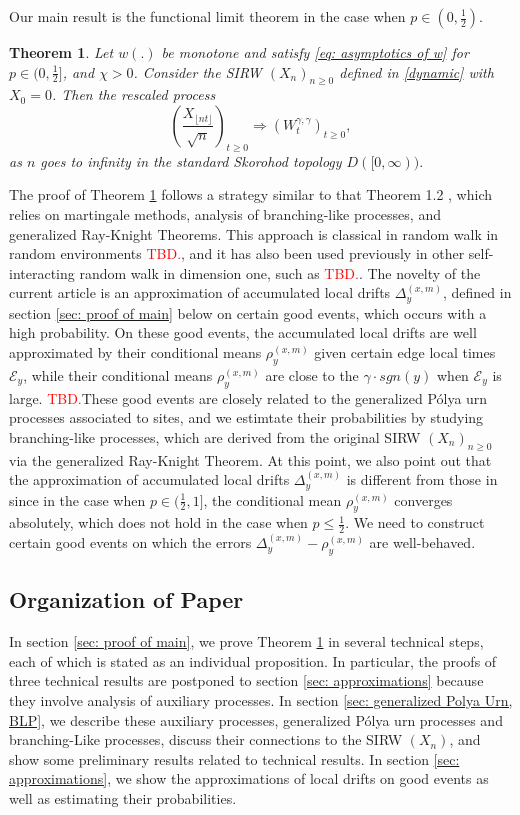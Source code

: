 \documentclass[twoside,12pt,a4paper]{article}
\newtheorem{theorem}{Theorem}[section]
\numberwithin{equation}{section}
\newcommand\TBD{\textcolor{red}{TBD.}}
\begin{document}
Our main result is the functional limit theorem in the case when $p\in (0,\frac{1}{2})$.
\begin{theorem}\label{thm: main}
 Let $w(.)$ be monotone and satisfy \eqref{eq: asymptotics of w} for $p\in (0,\frac{1}{2}]$, and $\mathcal{\chi} >0 $. Consider the SIRW $(X_n)_{n\geq 0}$ defined in \eqref{dynamic} with $X_0 =0$. Then the rescaled process
	 $$
	 \left(  \frac{X_{\lfloor nt \rfloor }}{\sqrt{n}}  \right)_{t\geq 0} \Longrightarrow \left( W^{\gamma,\gamma}_{t}\right)_{t\geq 0},
	 $$ as $n$ goes to infinity in the standard Skorohod topology $D([0,\infty) ).$
\end{theorem}
The proof of Theorem \ref{thm: main} follows a strategy similar to that Theorem 1.2 \cite{KMP22}, which relies on martingale methods, analysis of branching-like processes, and generalized Ray-Knight Theorems. This approach is classical in random walk in random environments \TBD, and it has also been used previously in other self-interacting random walk in dimension one, such as \TBD. The novelty of the current article is an approximation of accumulated local drifts $\Delta_y^{(x,m)}$, defined in section \ref{sec: proof of main} below on certain good events, which occurs with a high probability. On these good events, the accumulated local drifts are well approximated by their conditional means $\rho_{y}^{(x,m)}$ given certain edge local times $\mathcal{E}_y$, while their conditional means $\rho_{y}^{(x,m)}$ are close to the $\gamma \cdot sgn(y)$ when  $\mathcal{E}_y$ is large. \TBD These good events are closely related to the generalized P\'{o}lya  urn processes associated to sites, and we estimtate their probabilities by studying branching-like processes, which are derived from the original SIRW $(X_n)_{n\geq 0}$ via the generalized Ray-Knight Theorem. At this point, we also point out that the approximation of accumulated local drifts $\Delta_y^{(x,m)}$ is different from those in \cite{KMP22} since in the case when $p\in(\frac{1}{2},1]$, the conditional mean $\rho_{y}^{(x,m)}$ converges absolutely, which does not hold in the case when $p\leq \frac{1}{2}$. We need to construct certain good events on which the errors $\Delta_y^{(x,m)}- \rho_y^{(x,m)}$ are well-behaved.

\subsection{Organization of Paper}
In section \ref{sec: proof of main}, we prove Theorem \ref{thm: main} in several technical steps, each of which is stated as an individual proposition. In particular, the proofs of three technical results are postponed to section \ref{sec: approximations} because they involve analysis of auxiliary processes. In section \ref{sec: generalized Polya Urn, BLP}, we describe these auxiliary processes, generalized P\'{o}lya urn processes and branching-Like processes, discuss their connections to the SIRW $(X_n)$, and show some preliminary results related to technical results. In section \ref{sec: approximations}, we show the approximations of local drifts on good events as well as estimating their probabilities. 
\end{document}
